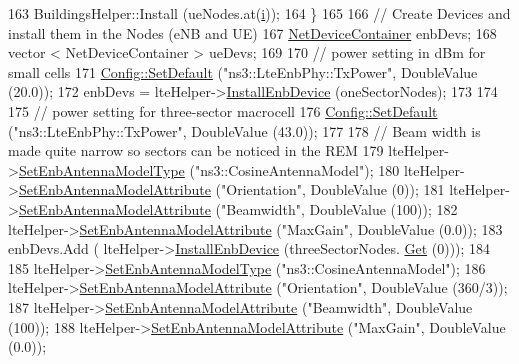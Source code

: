 \begin{DoxyCode}
163       BuildingsHelper::Install (ueNodes.at(\hyperlink{bernuolliDistribution_8m_a6f6ccfcf58b31cb6412107d9d5281426}{i}));
164     \}
165 
166   \textcolor{comment}{// Create Devices and install them in the Nodes (eNB and UE)}
167   \hyperlink{classns3_1_1NetDeviceContainer}{NetDeviceContainer} enbDevs;
168   vector < NetDeviceContainer > ueDevs;
169 
170   \textcolor{comment}{// power setting in dBm for small cells}
171   \hyperlink{group__config_ga2e7882df849d8ba4aaad31c934c40c06}{Config::SetDefault} (\textcolor{stringliteral}{"ns3::LteEnbPhy::TxPower"}, DoubleValue (20.0));
172   enbDevs = lteHelper->\hyperlink{classns3_1_1LteHelper_a5e009ad35ef85f46b5a6099263f15a03}{InstallEnbDevice} (oneSectorNodes);
173 
174 
175   \textcolor{comment}{// power setting for three-sector macrocell}
176   \hyperlink{group__config_ga2e7882df849d8ba4aaad31c934c40c06}{Config::SetDefault} (\textcolor{stringliteral}{"ns3::LteEnbPhy::TxPower"}, DoubleValue (43.0));
177 
178   \textcolor{comment}{// Beam width is made quite narrow so sectors can be noticed in the REM}
179   lteHelper->\hyperlink{classns3_1_1LteHelper_a758494fc0edaeaf7f311c6aa1c0b42d9}{SetEnbAntennaModelType} (\textcolor{stringliteral}{"ns3::CosineAntennaModel"});
180   lteHelper->\hyperlink{classns3_1_1LteHelper_ac0c1bc4eddaf7f8711f282cb681f99c5}{SetEnbAntennaModelAttribute} (\textcolor{stringliteral}{"Orientation"}, DoubleValue (0));
181   lteHelper->\hyperlink{classns3_1_1LteHelper_ac0c1bc4eddaf7f8711f282cb681f99c5}{SetEnbAntennaModelAttribute} (\textcolor{stringliteral}{"Beamwidth"},   DoubleValue (100));
182   lteHelper->\hyperlink{classns3_1_1LteHelper_ac0c1bc4eddaf7f8711f282cb681f99c5}{SetEnbAntennaModelAttribute} (\textcolor{stringliteral}{"MaxGain"},     DoubleValue (0.0));
183   enbDevs.Add ( lteHelper->\hyperlink{classns3_1_1LteHelper_a5e009ad35ef85f46b5a6099263f15a03}{InstallEnbDevice} (threeSectorNodes.
      \hyperlink{classns3_1_1NodeContainer_a9ed96e2ecc22e0f5a3d4842eb9bf90bf}{Get} (0)));
184 
185   lteHelper->\hyperlink{classns3_1_1LteHelper_a758494fc0edaeaf7f311c6aa1c0b42d9}{SetEnbAntennaModelType} (\textcolor{stringliteral}{"ns3::CosineAntennaModel"});
186   lteHelper->\hyperlink{classns3_1_1LteHelper_ac0c1bc4eddaf7f8711f282cb681f99c5}{SetEnbAntennaModelAttribute} (\textcolor{stringliteral}{"Orientation"}, DoubleValue (360/3));
187   lteHelper->\hyperlink{classns3_1_1LteHelper_ac0c1bc4eddaf7f8711f282cb681f99c5}{SetEnbAntennaModelAttribute} (\textcolor{stringliteral}{"Beamwidth"},   DoubleValue (100));
188   lteHelper->\hyperlink{classns3_1_1LteHelper_ac0c1bc4eddaf7f8711f282cb681f99c5}{SetEnbAntennaModelAttribute} (\textcolor{stringliteral}{"MaxGain"},     DoubleValue (0.0));

\end{DoxyCode}
